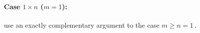 \paragraph{Case $1\times n$ ($m=1$):}
use an exactly complementary argument to the case \(m\geq n=1\)\,.



